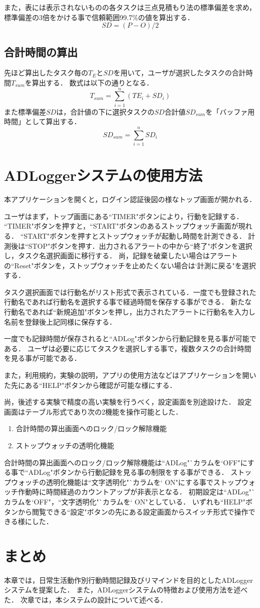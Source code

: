 また，表には表示されないものの各タスクは三点見積もり法の標準偏差を求め，標準偏差の3倍をかける事で信頼範囲99.7\%の値を算出する．
\[ SD = (P - O)/2\]

\subsection{合計時間の算出}

先ほど算出したタスク毎の$T_{E}$と$SD$を用いて，ユーザが選択したタスクの合計時間$T_{sum}$を算出する．
数式は以下の通りとなる．
\[ T_{sum}= \displaystyle\sum_{i=1}^{n} (TE_{i} + SD_{i})\]
また標準偏差$SD$は，合計値の下に選択タスクの$SD$合計値$SD_{sum}$を「バッファ用時間」として算出する．
\[ SD_{sum}= \displaystyle\sum_{i=1}^{n}  SD_{i}\]



\section{ADLoggerシステムの使用方法}
本アプリケーションを開くと，ログイン認証後図の様なトップ画面が開かれる．%

ユーザはまず，トップ画面にある``TIMER"ボタンにより，行動を記録する．
``TIMER"ボタンを押すと，``START"ボタンのあるストップウォッチ画面が現れる．
``START"ボタンを押すとストップウォッチが起動し時間を計測できる．
計測後は``STOP"ボタンを押す．出力されるアラートの中から``終了"ボタンを選択し，タスク名選択画面に移行する．
尚，記録を破棄したい場合はアラートの``Reset"ボタンを，ストップウォッチを止めたくない場合は`計測に戻る"を選択する．

タスク選択画面では行動名がリスト形式で表示されている．一度でも登録された行動名であれば行動名を選択する事で経過時間を保存する事ができる．
新たな行動名であれば``新規追加"ボタンを押し，出力されたアラートに行動名を入力し名前を登録後上記同様に保存する．

一度でも記録時間が保存されると``ADLog"ボタンから行動記録を見る事が可能である．
ユーザは必要に応じてタスクを選択しする事で，複数タスクの合計時間を見る事が可能である．

また，利用規約，実験の説明，アプリの使用方法などはアプリケーションを開いた先にある``HELP"ボタンから確認が可能な様にする．

尚，後述する実験で精度の高い実験を行うべく，設定画面を別途設けた．
設定画面はテーブル形式であり次の2機能を操作可能とした．
\begin{enumerate}
  \item 合計時間の算出画面へのロック/ロック解除機能
  \item ストップウォッチの透明化機能
\end{enumerate}
合計時間の算出画面へのロック/ロック解除機能は``ADLog"`カラムを`OFF"にする事で``ADLog"ボタンから行動記録を見る事の制限をする事ができる．
ストップウォッチの透明化機能は``文字透明化"`カラムを` ON"にする事でストップウォッチ作動時に時間経過のカウントアップが非表示となる．
初期設定は``ADLog"`カラムを`OFF"，``文字透明化"`カラムを` ON"としている．
いずれも``HELP"ボタンから閲覧できる``設定"ボタンの先にある設定画面からスイッチ形式で操作できる様にした．


\section{まとめ}
本章では，日常生活動作別行動時間記録及びリマインドを目的としたADLoggerシステムを提案した．
また，ADLoggerシステムの特徴および使用方法を述べた．
次章では，本システムの設計について述べる．